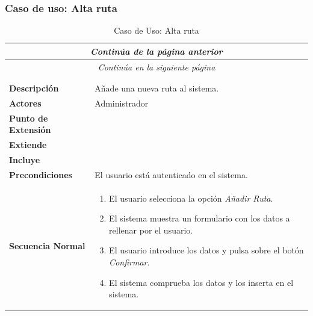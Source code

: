 \newpage
\subsubsection*{Caso de uso: Alta ruta }
\begin{longtable}{| p{4cm} | p{10cm} |}
\endfirsthead
\multicolumn{2}{c}{\textit{Continúa de la página anterior}}\\[12pt]
\hline
\endhead
\hline
\multicolumn{2}{c}{\textit{Continúa en la siguiente página}} \\
\endfoot
\hline
\caption{Caso de Uso: Alta ruta}\label{fig:1}\\
\endlastfoot


\hline
\multicolumn{2}{|c|}{\textbf{CU$<$28$>$ - Alta Ruta}} \\

\hline
\textbf{Descripción} &
Añade una nueva ruta al sistema.\\

\hline
\textbf{Actores} &
Administrador\\

\hline
\textbf{Punto de Extensión} &
\\

\hline
\textbf{Extiende} &
\\

\hline
\textbf{Incluye} &
\\

\hline
\textbf{Precondiciones} &
El usuario está autenticado en el sistema.\\

\hline
\textbf{Secuencia Normal} &\mbox{}\par\vspace{-\baselineskip}
\begin{enumerate}[leftmargin=0.7cm, topsep=0.1cm]
\item El usuario selecciona la opción \textit{Añadir Ruta}.
\item El sistema muestra un formulario con los datos a rellenar por el usuario.
\item El usuario introduce los datos y pulsa sobre el botón \textit{Confirmar}.
\item El sistema comprueba los datos y los inserta en el sistema.
\end{enumerate}



\end{longtable}
